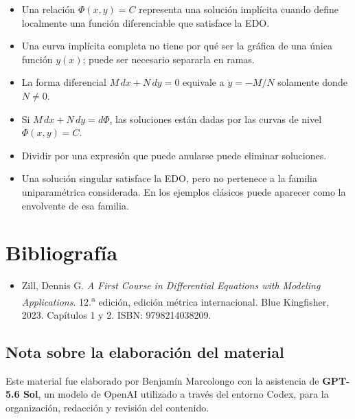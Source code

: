 \documentclass[12pt,a4paper]{article}
\begin{document}
	\begin{itemize}[leftmargin=*]
		\item Una relación \(\Phi(x,y)=C\) representa una solución implícita cuando define localmente una función diferenciable que satisface la EDO.
		\item Una curva implícita completa no tiene por qué ser la gráfica de una única función \(y(x)\); puede ser necesario separarla en ramas.
		\item La forma diferencial \(M\,dx+N\,dy=0\) equivale a \(\dot{y}=-M/N\) solamente donde \(N\neq 0\).
		\item Si \(M\,dx+N\,dy=d\Phi\), las soluciones están dadas por las curvas de nivel \(\Phi(x,y)=C\).
		\item Dividir por una expresión que puede anularse puede eliminar soluciones.
		\item Una solución singular satisface la EDO, pero no pertenece a la familia uniparamétrica considerada. En los ejemplos clásicos puede aparecer como la envolvente de esa familia.
	\end{itemize}

	\section*{Bibliografía}

	\begin{itemize}[leftmargin=*]
		\item Zill, Dennis G. \textit{A First Course in Differential Equations with Modeling Applications}. 12.\textsuperscript{a} edición, edición métrica internacional. Blue Kingfisher, 2023. Capítulos 1 y 2. ISBN: 9798214038209.
	\end{itemize}

	\subsection*{Nota sobre la elaboración del material}

	Este material fue elaborado por Benjamín Marcolongo con la asistencia de \textbf{GPT-5.6 Sol}, un modelo de OpenAI utilizado a través del entorno Codex, para la organización, redacción y revisión del contenido.
\end{document}
